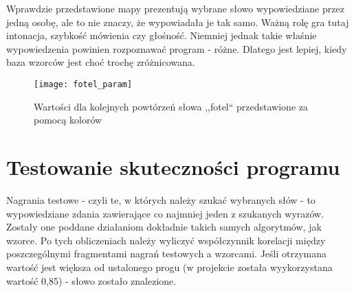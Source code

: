 Wprawdzie przedstawione mapy prezentują wybrane słowo wypowiedziane przez jedną osobę, ale to nie znaczy, że wypowiadała je tak samo. Ważną rolę gra tutaj intonacja, szybkość mówienia czy głośność. Niemniej jednak takie właśnie wypowiedzenia powinien rozpoznawać program - różne. Dlatego jest lepiej, kiedy baza wzorców jest choć trochę zróżnicowana.

\begin{figure}[H]
	\centering
	\texttt{[image: fotel\_param]}
	\caption{Wartości dla kolejnych powtórzeń słowa ,,fotel`` przedstawione za pomocą kolorów}
	\label{rys:fotel_param}
\end{figure}


\section{Testowanie skuteczności programu}

Nagrania testowe - czyli te, w których należy szukać wybranych słów - to wypowiedziane zdania zawierające co najmniej jeden z szukanych wyrazów. Zostały one poddane działaniom dokładnie takich samych algorytmów, jak wzorce. Po tych obliczeniach należy wyliczyć współczynnik korelacji między poszczególnymi fragmentami nagrań testowych a wzorcami. Jeśli otrzymana wartość jest większa od ustalonego progu (w projekcie została wyykorzystana wartość 0,85) - słowo zostało znalezione. 